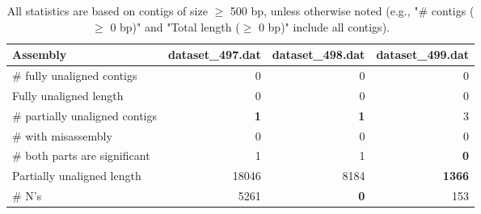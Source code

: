 \documentclass[12pt,a4paper]{article}
\begin{document}
\begin{table}[ht]
\begin{center}
\caption{All statistics are based on contigs of size $\geq$ 500 bp, unless otherwise noted (e.g., "\# contigs ($\geq$ 0 bp)" and "Total length ($\geq$ 0 bp)" include all contigs).}
\begin{tabular}{|l*{3}{|r}|}
\hline
Assembly & dataset\_497.dat & dataset\_498.dat & dataset\_499.dat \\ \hline
\# fully unaligned contigs & 0 & 0 & 0 \\ \hline
Fully unaligned length & 0 & 0 & 0 \\ \hline
\# partially unaligned contigs & {\bf 1} & {\bf 1} & 3 \\ \hline
\hspace{5mm}\# with misassembly & 0 & 0 & 0 \\ \hline
\hspace{5mm}\# both parts are significant & 1 & 1 & {\bf 0} \\ \hline
Partially unaligned length & 18046 & 8184 & {\bf 1366} \\ \hline
\# N's & 5261 & {\bf 0} & 153 \\ \hline
\end{tabular}
\end{center}
\end{table}
\end{document}
